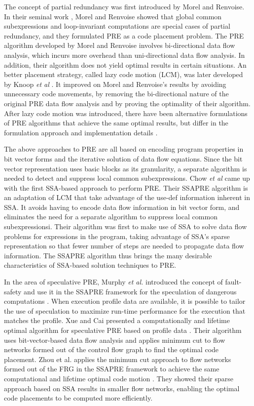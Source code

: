 The concept of partial redundancy was first introduced by Morel and 
Renvoise.  In their seminal work \cite{MR79}, Morel and Renvoise showed that
global common subexpressions and loop-invariant computations are special
cases of partial redundancy, and they formulated PRE as a code placement
problem.  The PRE algorithm developed by Morel and Renvoise
involves bi-directional data flow analysis, which incurs more overhead
than uni-directional data flow analysis.  In addition, their algorithm
does not yield optimal results in certain situations.
An better placement strategy, called lazy code motion (LCM), was later 
developed by Knoop {\it et al} \cite{Knoop92}\cite{Knoop94}.  It improved on
Morel and Renvoise's results by avoiding unnecessary code movements, by
removing the bi-directional nature of the original PRE data flow analysis and
by proving the optimality of their algorithm.
After lazy code motion was introduced, there have been alternative 
formulations of PRE algorithms that achieve the same optimal results, 
but differ in the formulation approach and implementation 
details \cite{DS93}\cite{Dhamdhere02}\cite{Paleri03}\cite{XueKnoop06}.

The above approaches to PRE are all based on encoding program properties 
in bit vector forms and the iterative solution of data flow equations.
Since the bit vector representation uses basic blocks as its granularity,
a separate algorithm is needed to detect and suppress local common
subexpressions.
Chow {\it et al} \cite{Chow97}\cite{Kennedy99} came up with the first
SSA-based approach to perform PRE.  Their SSAPRE algorithm is an adaptation of 
LCM that take advantage of the use-def information inherent in SSA.  It avoids
having to encode data flow information in bit vector form, and eliminates the
need for a separate algorithm to suppress local common subexpressionsi.
Their algorithm was first to make use of SSA to solve data flow problems
for expressions in the program, taking advantage of SSA's sparse representation
so that fewer number of steps are needed to propagate data flow information.  
The SSAPRE algorithm thus brings the many
desirable characteristics of SSA-based solution techniques to PRE.

In the area of speculative PRE,
Murphy {\it et al.} introduced the concept of fault-safety and use it in
the SSAPRE framework for the speculation of dangerous 
computations \cite{Murphy08}.   
When execution profile data are available, it is possible to tailor the use
of speculation to maximize run-time performance for the execution 
that matches the profile.  Xue and Cai presented a computationally 
and lifetime optimal algorithm
for speculative PRE based on profile data \cite{Xue06}.  Their algorithm
uses bit-vector-based data flow analysis and applies minimum cut to flow
networks formed out of the control flow graph to find the optimal code
placement.  Zhou {et al.} applies the 
minimum cut approach to flow networks formed out of the FRG in the SSAPRE 
framework to achieve the same computational and lifetime optimal code 
motion \cite{zhou11}.  They showed their sparse approach based on SSA results
in smaller flow networks, enabling the optimal code placements to be 
computed more efficiently.

